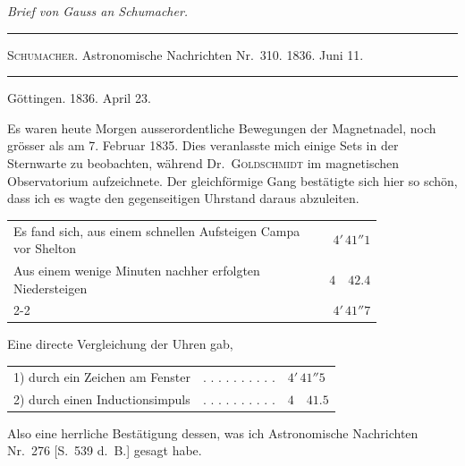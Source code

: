 \clearpage
{}\vspace{6mm}
\begin{center}
{\large\itshape Brief von Gauss an Schumacher.\par}
\vspace{5mm}\hrule\vspace{2mm}
{\small \textsc{Schumacher}. Astronomische Nachrichten Nr.\ 310. 1836. Juni 11.\par}
\vspace{2mm}\hrule\vspace{5mm}
\end{center}
\begin{flushright}Göttingen. 1836. April 23.\end{flushright}
Es waren heute Morgen ausserordentliche Bewegungen der Magnetnadel, noch grösser als am 7. Februar 1835. Dies veranlasste mich einige Sets in der Sternwarte zu beobachten, während Dr.\ \textsc{Goldschmidt} im magnetischen Observatorium aufzeichnete. Der gleichförmige Gang bestätigte sich hier so schön, dass ich es wagte den gegenseitigen Uhrstand daraus abzuleiten.

\begin{center}\small
\begin{tabular}{@{}p{0.82\linewidth}r@{}}
Es fand sich, aus einem schnellen Aufsteigen Campa vor Shelton & $4'\,41''1$\\
Aus einem wenige Minuten nachher erfolgten Niedersteigen & $4\quad42.4$\\\cline{2-2}
\multicolumn{1}{r}{Mittel} & $4'\,41''7$
\end{tabular}
\end{center}
Eine directe Vergleichung der Uhren gab,
\begin{center}\small
\begin{tabular}{@{}lll@{}}
1) durch ein Zeichen am Fenster & . . . . . . . . . . & $4'\,41''5$\\
2) durch einen Inductionsimpuls & . . . . . . . . . . & $4\quad41.5$
\end{tabular}
\end{center}
Also eine herrliche Bestätigung dessen, was ich Astronomische Nachrichten Nr.\ 276 [S.\ 539 d.\ B.] gesagt habe.

